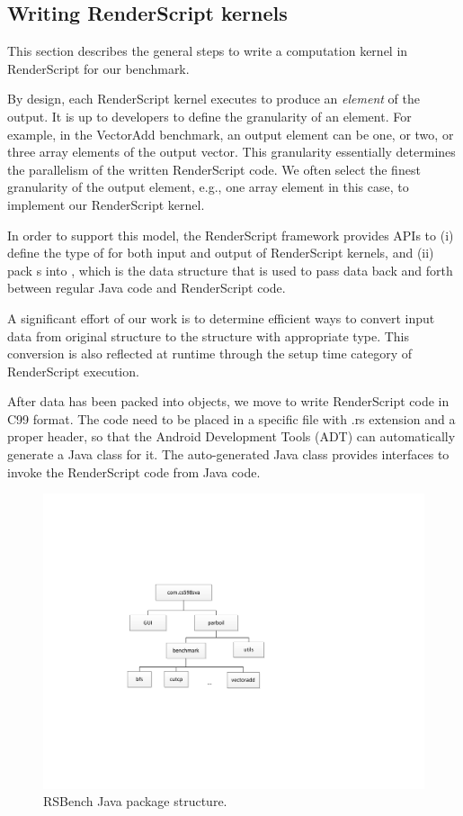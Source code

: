 \subsection*{Writing RenderScript kernels}
This section describes the general steps to write a computation kernel in
RenderScript for our benchmark.

By design, each RenderScript kernel executes to produce an \textit{element} of
the output. It is up to developers to define the granularity of an element. For
example, in the VectorAdd benchmark, an output element can be one, or two, or
three array elements of the output vector. This granularity essentially
determines the parallelism of the written RenderScript code. We often select the
finest granularity of the output element, e.g., one array element in this case,
to implement our RenderScript kernel.


In order to support this model, the RenderScript framework provides APIs to
(i) define the type of  for both input and output of RenderScript
kernels, and (ii) pack s into , which is the data structure
that is used to pass data back and forth between regular Java code and
RenderScript code.

A significant effort of our work is to determine efficient ways to convert input
data from original structure to the  structure with appropriate
 type. This conversion is also reflected at runtime through the
setup time category of RenderScript execution.

After data has been packed into  objects, we move to write
RenderScript code in C99 format. The code need to be placed in a specific file
with .rs extension and a proper header, so that the Android Development Tools
(ADT) can automatically generate a Java class for it. The auto-generated Java
class provides interfaces to invoke the RenderScript code from Java code.



\begin{figure}[t!]
\includegraphics[scale=0.65]{figs/package_diagram.pdf}
\caption{RSBench Java package structure.}
\label{fig:package_structure}
\centering
\end{figure}


